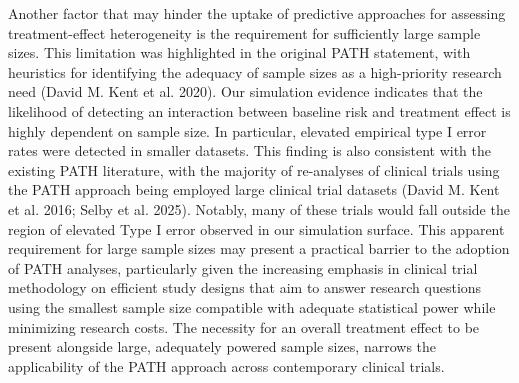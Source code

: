 \documentclass{article}
\begin{document}
Another factor that may hinder the uptake of predictive approaches for
assessing treatment-effect heterogeneity is the requirement for
sufficiently large sample sizes. This limitation was highlighted in the
original PATH statement, with heuristics for identifying the adequacy of
sample sizes as a high-priority research need (David M. Kent et al.
2020). Our simulation evidence indicates that the likelihood of
detecting an interaction between baseline risk and treatment effect is
highly dependent on sample size. In particular, elevated empirical type
I error rates were detected in smaller datasets. This finding is also
consistent with the existing PATH literature, with the majority of
re-analyses of clinical trials using the PATH approach being employed
large clinical trial datasets (David M. Kent et al. 2016; Selby et al.
2025). Notably, many of these trials would fall outside the region of
elevated Type I error observed in our simulation surface. This apparent
requirement for large sample sizes may present a practical barrier to
the adoption of PATH analyses, particularly given the increasing
emphasis in clinical trial methodology on efficient study designs that
aim to answer research questions using the smallest sample size
compatible with adequate statistical power while minimizing research
costs. The necessity for an overall treatment effect to be present
alongside large, adequately powered sample sizes, narrows the
applicability of the PATH approach across contemporary clinical trials.
\end{document}
